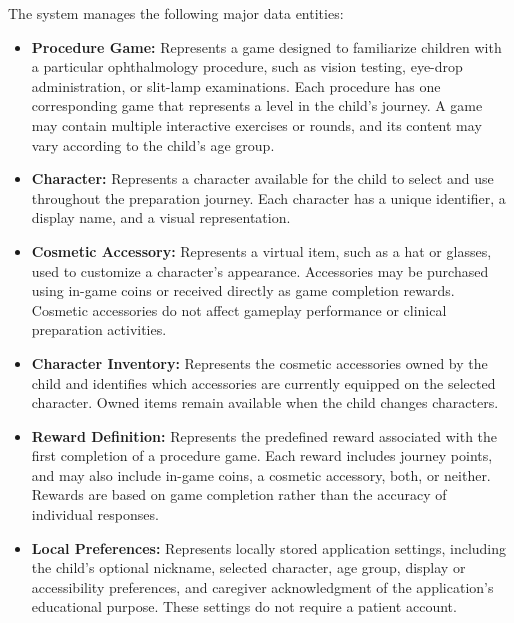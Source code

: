 \documentclass[10pt]{article}
\makeatletter
\newcommand{\termsecnum}{\ifnum\value{subsection}=0 \thesection\else\thesubsection\fi}
\newcommand{\termmark}[1]{%
  \hypertarget{term:#1}{}%
  \protected@write\@auxout{}{\string\newlabel{termsec:#1}{{\termsecnum}{\thepage}{}{}{}}}%
}
\makeatother
\begin{document}
The system manages the following major data entities:

\begin{itemize}

    \item \textbf{Procedure Game:}
    Represents a game designed to familiarize children
    with a particular ophthalmology procedure, such as
    vision testing, eye-drop administration, or slit-lamp
    examinations. Each procedure has one corresponding
    game that represents a level in the child's journey.
    A game may contain multiple interactive exercises
    or rounds, and its content may vary according to
    the child's age group.

    \item \textbf{Character:}
    Represents a character available for the child to
    select and use throughout the preparation journey.
    Each character has a unique identifier, a display
    name, and a visual representation.

    \item \textbf{Cosmetic Accessory:}
    Represents a virtual item, such as a hat or glasses,
    used to customize a character's appearance.
    Accessories may be purchased using in-game coins
    or received directly as game completion rewards.
    Cosmetic accessories do not affect gameplay
    performance or clinical preparation activities.

    \item \textbf{\termmark{characterinventory}Character Inventory:}
    Represents the cosmetic accessories owned by the
    child and identifies which accessories are currently
    equipped on the selected character. Owned items
    remain available when the child changes characters.

    \item \textbf{Reward Definition:}
    Represents the predefined reward associated with
    the first completion of a procedure game.
    Each reward includes journey points, and may also
    include in-game coins, a cosmetic accessory, both,
    or neither.
    Rewards are based on game completion rather
    than the accuracy of individual responses.

    \item \textbf{Local Preferences:}
    Represents locally stored application settings,
    including the child's optional nickname, selected
    character, age group, display or accessibility
    preferences, and caregiver acknowledgment of
    the application's educational purpose.
    These settings do not require a patient account.


\end{itemize}
\end{document}
